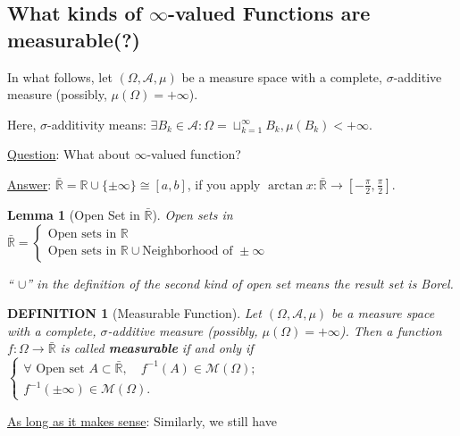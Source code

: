 \documentclass[12pt]{article}
\theoremstyle{blueplain}
\newtheorem{lemma}[theorem]{Lemma}
\theoremstyle{bluedef}
\newtheorem{definition}{DEFINITION}[section]
\theoremstyle{blueremark}
\newcommand{\R}{\mathbb{R}}
\numberwithin{equation}{section}
\begin{document}
\clearpage

\subsection{What kinds of $\infty$-valued Functions are measurable(?)}

\noindent In what follows, let $(\Omega, \mathcal{A}, \mu)$ be a measure space with a complete, $\sigma$-additive measure (possibly, $\mu(\Omega) = +\infty$).

\noindent Here, $\sigma$-additivity means: $\exists B_k \in \mathcal{A}: \Omega = \sqcup_{k=1}^\infty B_k, \mu(B_k) < +\infty$.

\noindent \underline{Question}: What about $\infty$-valued function?

\noindent \underline{Answer}: $\bar{\R} = \R \cup \{\pm \infty\} \cong [a,b]$, if you apply $\arctan x: \bar{\R} \rightarrow [-\frac{\pi}{2},\frac{\pi}{2}]$.

\begin{lemma}[Open Set in $\bar{\R}$]\index{Open Set in $\bar{\R}$}
  Open sets in $\bar{\R} = \begin{cases} \text{Open sets in } \R \\ \text{Open sets in } \R \cup \text{Neighborhood of }  \pm \infty \end{cases}$

  `` $\cup$'' in the definition of the second kind of open set means the result set is Borel.
\end{lemma}

\begin{definition}[Measurable Function]

  Let $(\Omega, \mathcal{A}, \mu)$ be a measure space with a complete, $\sigma$-additive measure (possibly, $\mu(\Omega) = +\infty$). Then a function $f: \Omega \rightarrow \bar{\R}$ is called \textbf{measurable} if and only if $\begin{cases} \forall \text{ Open set } A \subset \bar{\R}, \quad f^{-1}(A) \in \mathcal{M}(\Omega); \\ f^{-1}(\pm \infty) \in \mathcal{M}(\Omega). \end{cases}$
\end{definition}

\noindent \underline{As long as it makes sense}: Similarly,  we still have
\end{document}
